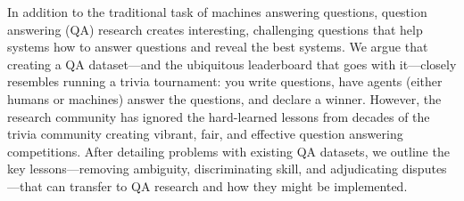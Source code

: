 In addition to the traditional task of machines answering questions, question answering (QA) research creates interesting, challenging questions that help systems how to answer questions and reveal the best systems. We argue that creating a QA dataset—and the ubiquitous leaderboard that goes with it—closely resembles running a trivia tournament: you write questions, have agents (either humans or machines) answer the questions, and declare a winner. However, the research community has ignored the hard-learned lessons from decades of the trivia community creating vibrant, fair, and effective question answering competitions. After detailing problems with existing QA datasets, we outline the key lessons—removing ambiguity, discriminating skill, and adjudicating disputes---that can transfer to QA research and how they might be implemented.
